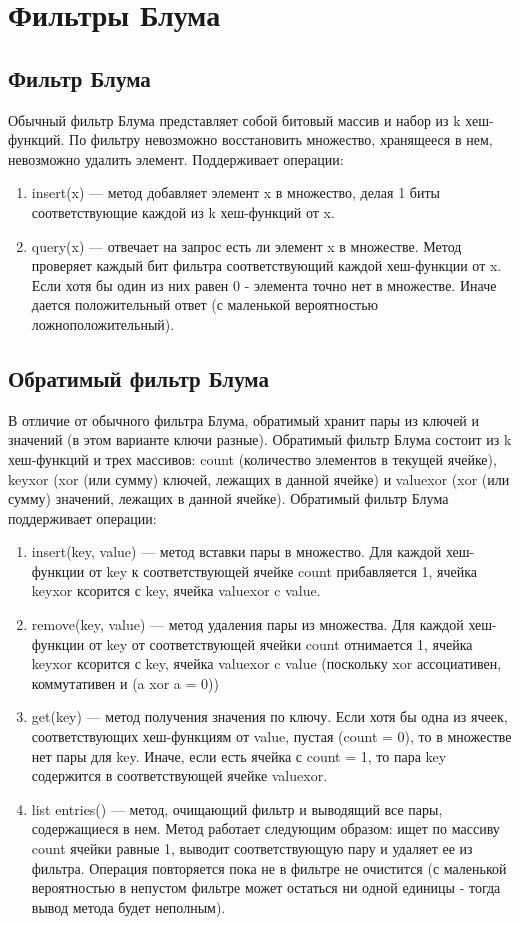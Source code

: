 \documentclass{article}
\begin{document}
\section{Фильтры Блума}
\subsection{Фильтр Блума}
Обычный фильтр Блума представляет собой битовый массив и набор из k хеш-функций.
По фильтру невозможно восстановить множество, хранящееся в нем, невозможно удалить элемент.
Поддерживает операции:
\begin{enumerate}
    \item insert(x) --- метод добавляет элемент x в множество, делая 1 биты соответствующие каждой из k хеш-функций от x. 
    \item query(x) --- отвечает на запрос есть ли элемент x в множестве. Метод проверяет каждый бит фильтра соответствующий каждой хеш-функции от x.
        Если хотя бы один из них равен 0 - элемента точно нет в множестве. Иначе дается положительный ответ (с маленькой вероятностью ложноположительный).
\end{enumerate}
\subsection{Обратимый фильтр Блума}
В отличие от обычного фильтра Блума, обратимый хранит пары из ключей и значений (в этом варианте ключи разные).
Обратимый фильтр Блума состоит из k хеш-функций и трех массивов: count (количество элементов в текущей ячейке),
keyxor (xor (или сумму) ключей, лежащих в данной ячейке) и valuexor (xor (или сумму) значений, лежащих в данной ячейке).
Обратимый фильтр Блума поддерживает операции:
\begin{enumerate}
    \item insert(key, value) --- метод вставки пары в множество. Для каждой хеш-функции от key к соответствующей ячейке count прибавляется 1, ячейка keyxor ксорится с key, ячейка valuexor c value.
    \item remove(key, value) --- метод удаления пары из множества. Для каждой хеш-функции от key от соответствующей ячейки count отнимается 1, ячейка keyxor ксорится с key, ячейка valuexor c value (поскольку xor ассоциативен, коммутативен и (a xor a = 0))
    \item get(key) --- метод получения значения по ключу. Если хотя бы одна из ячеек, соответствующих хеш-функциям от value, пустая (count = 0), то в множестве нет пары для key. Иначе, если есть ячейка с count = 1, то пара key содержится в соответствующей ячейке valuexor.
    \item list entries() --- метод, очищающий фильтр и выводящий все пары, содержащиеся в нем. Метод работает следующим образом: ищет по массиву count ячейки равные 1, выводит соответствующую пару и удаляет ее из фильтра. Операция повторяется пока не в фильтре не очистится (с маленькой вероятностью в непустом фильтре может остаться ни одной единицы - тогда вывод метода будет неполным).
\end{enumerate}
\end{document}
